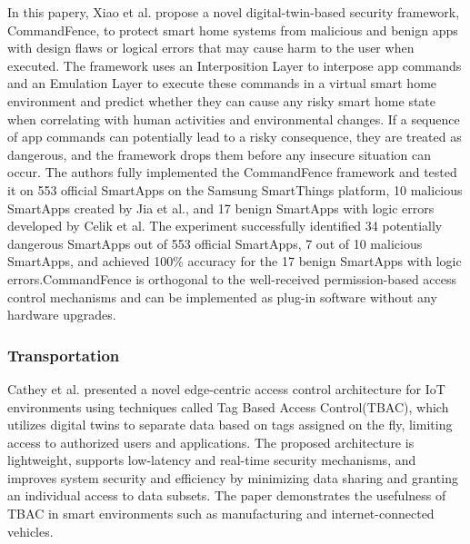 In\cite{xiaoCommandFenceNovelDigitalTwinBased2022} this papery,  Xiao et al. propose a novel digital-twin-based security framework, CommandFence, to protect smart home systems from malicious and benign apps with design flaws or logical errors that may cause harm to the user when executed. The framework uses an Interposition Layer to interpose app commands and an Emulation Layer to execute these commands in a virtual smart home environment and predict whether they can cause any risky smart home state when correlating with human activities and environmental changes. If a sequence of app commands can potentially lead to a risky consequence, they are treated as dangerous, and the framework drops them before any insecure situation can occur. The authors fully implemented the CommandFence framework and tested it on 553 official SmartApps on the Samsung SmartThings platform, 10 malicious SmartApps created by Jia et al., and 17 benign SmartApps with logic errors developed by Celik et al. The experiment successfully identified 34 potentially dangerous SmartApps out of 553 official SmartApps, 7 out of 10 malicious SmartApps, and achieved 100\% accuracy for the 17 benign SmartApps with logic errors.CommandFence is orthogonal to the well-received permission-based access control mechanisms and can be implemented as plug-in software without any hardware upgrades. 

\subsubsection{Transportation}

Cathey et al.\cite{glenandbensonjamesandguptamaanakandsandhuravicatheyEdgeCentricSecure2021} presented a novel edge-centric access control architecture for IoT environments using techniques called Tag Based Access Control(TBAC), which utilizes digital twins to separate data based on tags assigned on the fly, limiting access to authorized users and applications. The proposed architecture is lightweight, supports low-latency and real-time security mechanisms, and improves system security and efficiency by minimizing data sharing and granting an individual access to data subsets. The paper demonstrates the usefulness of TBAC in smart environments such as manufacturing and internet-connected vehicles.

